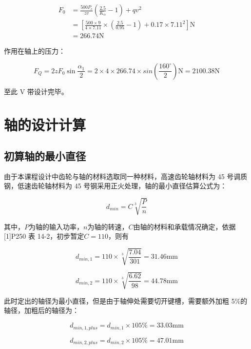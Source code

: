 \documentclass[12pt]{ctexart}
\begin{document}
\begin{align*}
    F_0 & = \frac{500P_c}{zv}\left(\frac{2.5}{K_\alpha}-1\right) + qv^2\\
    & = \left[\frac{500\times 9}{4\times 7.11}\times \left(\frac{2.5}{0.95}-1\right)+0.17\times 7.11^2\right]\text{N}\\
    & = 266.74\text{N}
\end{align*}

作用在轴上的压力：

$$F_Q = 2zF_0\sin \frac{\alpha_1}{2}=2\times 4\times 266.74\times sin(\frac{160^\circ}{2})\text{N}=2100.38\text{N}$$

至此 V 带设计完毕。

\section{轴的设计计算}

\subsection{初算轴的最小直径}

由于本课程设计中齿轮与轴的材料选取同一种材料，高速齿轮轴材料为 45 号调质钢，低速齿轮轴材料为 45 号钢采用正火处理，轴的最小直径估算公式为：

$$d_{min}=C\sqrt[3]{\frac{P}{n}}$$

其中，$P$为轴的输入功率，$n$为轴的转速，$C$由轴的材料和承载情况确定，依据 [1]P250 表 14-2，初步暂定$C=110$，则有

$$d_{min,1}=110\times \sqrt[3]{\frac{7.04}{301}} = 31.46\text{mm}$$

$$d_{min,2}=110\times \sqrt[3]{\frac{6.62}{98}} = 44.78\text{mm}$$

此时定出的轴径为最小直径，但是由于轴伸处需要切开键槽，需要额外加粗 5\%的轴径，加粗后的轴径为：

$$d_{min,1,plus} = d_{min,1}\times 105\% = 33.03\text{mm}$$

$$d_{min,2,plus} = d_{min,2}\times 105\% = 47.01\text{mm}$$
\end{document}
